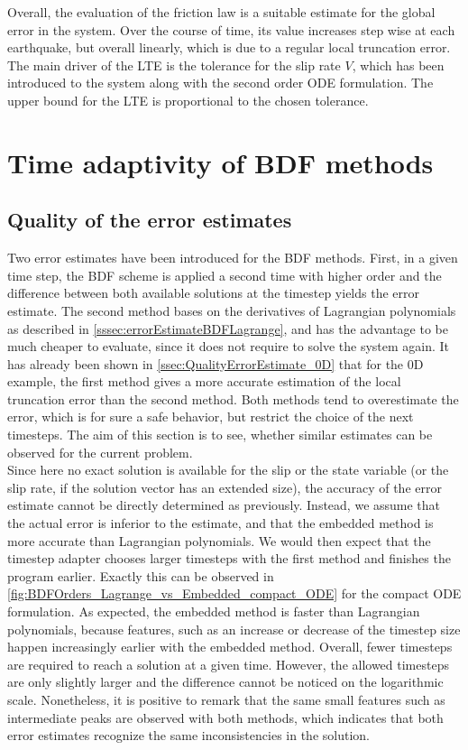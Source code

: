 Overall, the evaluation of the friction law is a suitable estimate for the global error in the system. Over the course of time, its value increases step wise at each earthquake, but overall linearly, which is due to a regular local truncation error. The main driver of the LTE is the tolerance for the slip rate $V$, which has been introduced to the system along with the second order ODE formulation. The upper bound for the LTE is proportional to the chosen tolerance.


\section{Time adaptivity of BDF methods}
\subsection{Quality of the error estimates}
Two error estimates have been introduced for the BDF methods. First, in a given time step, the BDF scheme is applied a second time with higher order and the difference between both available solutions at the timestep yields the error estimate. The second method bases on the derivatives of Lagrangian polynomials as described in \autoref{sssec:errorEstimateBDFLagrange}, and has the advantage to be much cheaper to evaluate, since it does not require to solve the system again. It has already been shown in \autoref{ssec:QualityErrorEstimate_0D} that for the 0D example, the first method gives a more accurate estimation of the local truncation error than the second method. Both methods tend to overestimate the error, which is for sure a safe behavior, but restrict the choice of the next timesteps. The aim of this section is to see, whether similar estimates can be observed for the current problem. \\
Since here no exact solution is available for the slip or the state variable (or the slip rate, if the solution vector has an extended size), the accuracy of the error estimate cannot be directly determined as previously. Instead, we assume that the actual error is inferior to the estimate, and that the embedded method is more accurate than Lagrangian polynomials. We would then expect that the timestep adapter chooses larger timesteps with the first method and finishes the program earlier. Exactly this can be observed in \autoref{fig:BDFOrders_Lagrange_vs_Embedded_compact_ODE} for the compact ODE formulation. As expected, the embedded method is faster than Lagrangian polynomials, because features, such as an increase or decrease of the timestep size happen increasingly earlier with the embedded method. Overall, fewer timesteps are required to reach a solution at a given time. However, the allowed timesteps are only slightly larger and the difference cannot be noticed on the logarithmic scale. Nonetheless, it is positive to remark that the same small features such as intermediate peaks are observed with both methods, which indicates that both error estimates recognize the same inconsistencies in the solution. 

